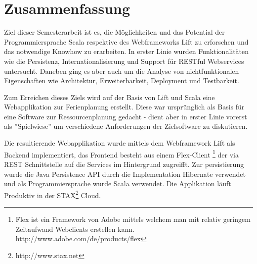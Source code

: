 \chapter*{Zusammenfassung}
Ziel dieser Semesterarbeit ist es, die M\"oglichkeiten und das Potential der Programmiersprache Scala respektive des Webframeworks Lift zu erforschen und das notwendige Knowhow zu erarbeiten. In erster Linie wurden Funktionalit\"aten wie die Persistenz, Internationalisierung und Support f\"ur RESTful Webservices untersucht. Daneben ging es aber auch um die Analyse von nichtfunktionalen Eigenschaften wie Architektur, Erweiterbarkeit, Deployment und Testbarkeit.

Zum Erreichen dieses Ziels wird auf der Basis von Lift und Scala eine Webapplikation zur Ferienplanung erstellt. Diese war urspr\"unglich als Basis f\"ur eine Software zur Ressourcenplanung gedacht - dient aber in erster Linie vorerst als ''Spielwiese'' um verschiedene Anforderungen der Zielsoftware zu diskutieren.

Die resultierende Webapplikation wurde mittels dem Webframework Lift als Backend implementiert, das Frontend besteht aus einem Flex-Client \footnote{Flex ist ein Framework von Adobe mittels welchem man mit relativ geringem Zeitaufwand Webclients erstellen kann. http://www.adobe.com/de/products/flex} der via REST Schnittstelle auf die Services im Hintergrund zugreifft. Zur persistierung wurde die Java Persistence API durch die Implementation Hibernate verwendet und als Programmiersprache wurde Scala verwendet. Die Applikation l\"auft Produktiv in der STAX\footnote{http://www.stax.net} Cloud.